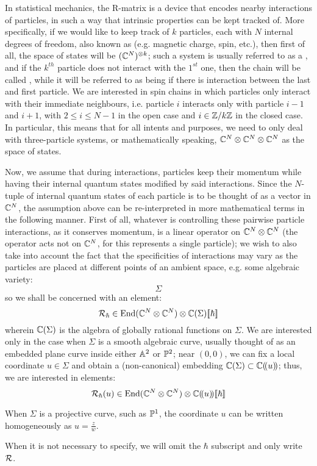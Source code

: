 In statistical mechanics, the R-matrix is a device that encodes nearby interactions of particles, in such a way that intrinsic properties can be kept tracked of. More specifically, if we would like to keep track of $k$ particles, each with $N$ internal degrees of freedom, also known as  (e.g. magnetic charge, spin, etc.), then first of all, the space of states will be $(\bbC^N)^{\tensor k}$; such a system is usually referred to as a , and if the $k^{th}$ particle does not interact with the $1^{st}$ one, then the chain will be called , while it will be referred to as being  if there is interaction between the last and first particle. We are interested in spin chains in which particles only interact with their immediate neighbours, i.e. particle $i$ interacts only with particle $i - 1$ and $i + 1$, with $2 \leq i \leq N - 1$ in the open case and $i \in \Z/k\Z$ in the closed case. In particular, this means that for all intents and purposes, we need to only deal with three-particle systems, or mathematically speaking, $\bbC^N \tensor \bbC^N \tensor \bbC^N$ as the space of states. 

Now, we assume that during interactions, particles keep their momentum while having their internal quantum states modified by said interactions. Since the $N$-tuple of internal quantum states of each particle is to be thought of as a vector in $\bbC^N$, the assumption above can be re-interpreted in more mathematical terms in the following manner. First of all, whatever is controlling these pairwise particle interactions, as it conserves momentum, is a linear operator on $\bbC^N \tensor \bbC^N$ (the operator acts not on $\bbC^N$, for this represents a single particle); we wish to also take into account the fact that the specificities of interactions may vary as the particles are placed at different points of an ambient space, e.g. some algebraic variety:
    $$\Sigma$$
so we shall be concerned with an element:
    $$\calR_{\hbar} \in \End( \bbC^N \tensor \bbC^N ) \tensor \bbC(\Sigma)[\![\hbar]\!]$$
wherein $\bbC(\Sigma)$ is the algebra of globally rational functions on $\Sigma$. We are interested only in the case when $\Sigma$ is a smooth algebraic curve, usually thought of as an embedded plane curve inside either $\A^2$ or $\P^2$; near $(0, 0)$, we can fix a local coordinate $u \in \Sigma$ and obtain a (non-canonical) embedding $\bbC(\Sigma) \subset \bbC(\!(u)\!)$; thus, we are interested in elements:
    $$\calR_{\hbar}(u) \in \End( \bbC^N \tensor \bbC^N ) \tensor \bbC(\!(u)\!)[\![\hbar]\!]$$
\begin{remark}
    When $\Sigma$ is a projective curve, such as $\P^1$, the coordinate $u$ can be written homogeneously as $u = \frac{z}{w}$. 
\end{remark}
\begin{convention}
    When it is not necessary to specify, we will omit the $\hbar$ subscript and only write $\calR$.
\end{convention}

